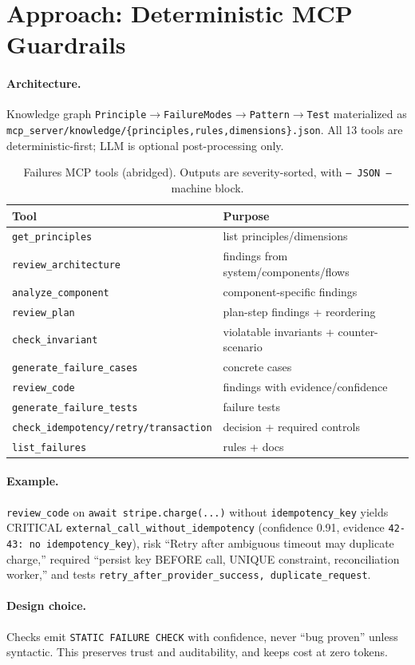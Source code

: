 \section{Approach: Deterministic MCP Guardrails}
\paragraph{Architecture.} Knowledge graph \texttt{Principle$\rightarrow$FailureModes$\rightarrow$Pattern$\rightarrow$Test} materialized as \texttt{mcp\_server/knowledge/\{principles,rules,dimensions\}.json}. All 13 tools are deterministic-first; LLM is optional post-processing only.

\begin{table}[h]\centering\small
\begin{tabular}{ll}
\toprule Tool & Purpose \\
\midrule
\texttt{get\_principles} & list principles/dimensions \\
\texttt{review\_architecture} & findings from system/components/flows \\
\texttt{analyze\_component} & component-specific findings \\
\texttt{review\_plan} & plan-step findings + reordering \\
\texttt{check\_invariant} & violatable invariants + counter-scenario \\
\texttt{generate\_failure\_cases} & concrete cases \\
\texttt{review\_code} & findings with evidence/confidence \\
\texttt{generate\_failure\_tests} & failure tests \\
\texttt{check\_idempotency/retry/transaction} & decision + required controls \\
\texttt{list\_failures} & rules + docs \\
\bottomrule
\end{tabular}
\caption{Failures MCP tools (abridged). Outputs are severity-sorted, with \texttt{--- JSON ---} machine block.}
\end{table}

\paragraph{Example.} \texttt{review\_code} on \texttt{await stripe.charge(...)} without \texttt{idempotency\_key} yields CRITICAL \texttt{external\_call\_without\_idempotency} (confidence 0.91, evidence \texttt{42-43: no idempotency\_key}), risk ``Retry after ambiguous timeout may duplicate charge,'' required ``persist key BEFORE call, UNIQUE constraint, reconciliation worker,'' and tests \texttt{retry\_after\_provider\_success, duplicate\_request}.

\paragraph{Design choice.} Checks emit \texttt{STATIC FAILURE CHECK} with confidence, never ``bug proven'' unless syntactic. This preserves trust and auditability, and keeps cost at zero tokens.
